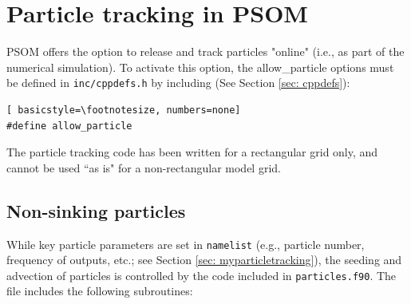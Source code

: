 \documentclass[12pt,letterpaper,titlepage]{article}
\begin{document}
\section{Particle tracking in PSOM}
PSOM offers the option to release and track particles "online" (i.e., as part of the numerical simulation). To activate this option, the allow\_particle options must be defined in \texttt{inc/cppdefs.h} by including (See Section \ref{sec: cppdefs}):
\begin{lstlisting}[	basicstyle=\footnotesize, numbers=none]
#define allow_particle
\end{lstlisting}
The particle tracking code has been written for a rectangular grid only, and cannot be used ``as is" for a non-rectangular model grid.
\subsection{Non-sinking particles}
While key particle parameters are set in \texttt{namelist} (e.g., particle number, frequency of outputs, etc.; see Section \ref{sec: myparticletracking}), the seeding and advection of particles is controlled by the code included in \texttt{particles.f90}. The file includes the following subroutines:
\end{document}
